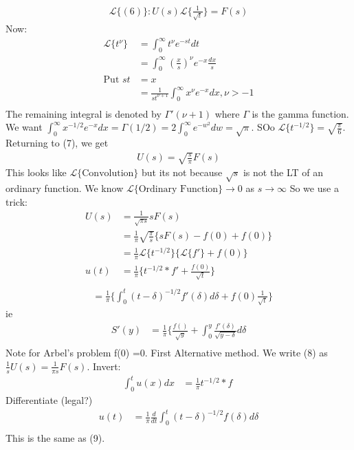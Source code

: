 \documentclass[10pt, oneside]{article}
\begin{document}
\begin{align}
    \mathscr{L}\{(6)\}  : U(s) \mathscr{L}\{\frac{1}{\sqrt{t}}\} = F(s)
\end{align}
Now:
\begin{align*}
    \mathscr{L} \{t^{\nu}\} & = \int_{0}^{\infty}t^{\nu}e^{-st}dt \\
    & = \int_{0}^{\infty}(\frac{x}{s})^{\nu}e^{-x} \frac{dx}{s} \\
    \text{Put } st & = x \\
    & = \frac{1}{st^{\nu+1}} \int_{0}^{\infty}x^{\nu}e^{-x} dx, \nu > -1\\
\end{align*}
The remaining integral is denoted by $\Gamma'(\nu+1)$ where $\Gamma$ is the gamma function. We want $\int_{0}^{\infty}x^{-1/2}e^{-x} dx = \Gamma(1/2) = 2\int_{0}^{\infty}e^{-w^{2}}dw = \sqrt{\pi}$. SOo $\mathscr{L}\{t^{-1/2} \} = \sqrt{\frac{\pi}{6}}$.
Returning to (7), we get 
\begin{align}
    U(s) =\sqrt{\frac{s}{\pi}}F(s)
\end{align}
This looks like $\mathscr{L}\{ \text{Convolution}\} $ but its not because $\sqrt{s}$ is not the LT of an ordinary function. We know $\mathscr{L} \{\text{Ordinary Function}\} \to 0$ as $s \to \infty$ So we use a trick:
\begin{align*}
    U(s)&= \frac{1}{\sqrt{\pi s}}sF(s) \\
    &=\frac{1}{\pi} \sqrt{\frac{\pi}{s}}\{sF(s) -f(0) + f(0)\}\\
    &=\frac{1}{\pi} \mathscr{L}\{t^{-1/2}\} \{\mathscr{L} \{f'\} + f(0)\} \\
    u(t) &= \frac{1}{\pi} \{t^{-1/2} * f'+\frac{f(0)}{\sqrt{t}}\} \\
\end{align*}
\begin{align}
    &= \frac{1}{\pi}\{ \int_{0}^{t}(t-\delta)^{-1/2} f'(\delta)d\delta +f(0)\frac{1}{\sqrt{t}}\} 
\end{align}
ie 
\begin{align*}
    S'(y) & = \frac{1}{\pi}\{ \frac{f()}{\sqrt{y}} + \int_{0}^{y}\frac{f'(\delta)}{\sqrt{y-\delta}}d\delta \\
\end{align*}
Note for Arbel's problem f(0) =0.
First Alternative method.  We write (8) as $\frac{1}{s} U(s) =\frac{1}{\pi s} F(s)$. Invert:
\begin{align}
    \int_{0}^{t}u(x) dx & = \frac{1}{\pi} t^{-1/2} * f \
\end{align}
Differentiate (legal?)
\begin{align*}
    u(t) &= \frac{1}{\pi} \frac{d}{dt} \int_{0}^{t}(t-\delta)^{-1/2} f(\delta) d\delta \\
\end{align*}
This is the same as (9).
\end{document}
